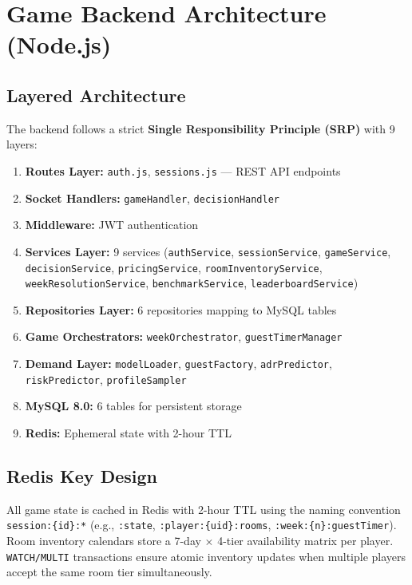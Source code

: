 \documentclass[12pt,a4paper,openany]{report}
\begin{document}
\section{Game Backend Architecture (Node.js)}

\subsection{Layered Architecture}

The backend follows a strict \textbf{Single Responsibility Principle (SRP)} with 9 layers:

\begin{enumerate}
  \item \textbf{Routes Layer:} \texttt{auth.js}, \texttt{sessions.js} --- REST API endpoints
  \item \textbf{Socket Handlers:} \texttt{gameHandler}, \texttt{decisionHandler}
  \item \textbf{Middleware:} JWT authentication
  \item \textbf{Services Layer:} 9 services (\texttt{authService}, \texttt{sessionService}, \texttt{gameService}, \texttt{decisionService}, \texttt{pricingService}, \texttt{roomInventoryService}, \texttt{weekResolutionService}, \texttt{benchmarkService}, \texttt{leaderboardService})
  \item \textbf{Repositories Layer:} 6 repositories mapping to MySQL tables
  \item \textbf{Game Orchestrators:} \texttt{weekOrchestrator}, \texttt{guestTimerManager}
  \item \textbf{Demand Layer:} \texttt{modelLoader}, \texttt{guestFactory}, \texttt{adrPredictor}, \texttt{riskPredictor}, \texttt{profileSampler}
  \item \textbf{MySQL 8.0:} 6 tables for persistent storage
  \item \textbf{Redis:} Ephemeral state with 2-hour TTL
\end{enumerate}

\subsection{Redis Key Design}

All game state is cached in Redis with 2-hour TTL using the naming convention \texttt{session:\{id\}:*} (e.g., \texttt{:state}, \texttt{:player:\{uid\}:rooms}, \texttt{:week:\{n\}:guestTimer}). Room inventory calendars store a 7-day $\times$ 4-tier availability matrix per player. \texttt{WATCH/MULTI} transactions ensure atomic inventory updates when multiple players accept the same room tier simultaneously.
\end{document}
